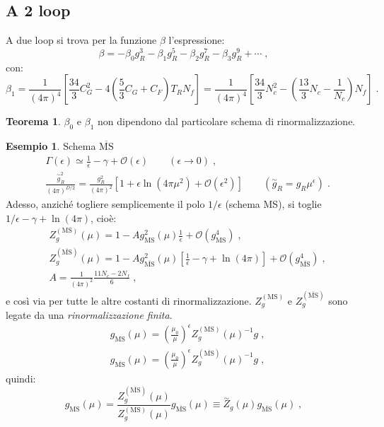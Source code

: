 \documentclass[12pt,a4paper]{article}
\theoremstyle{definition}
\newtheorem{thm}{Teorema}
\newtheorem{exm}{Esempio}
\numberwithin{equation}{section}
\begin{document}
\subsection{A 2 loop}
A due loop si trova per la funzione $\beta$ l'espressione:
$$
\beta=-\beta_0g_R^3-\beta_1g_R^5-\beta_2g_R^7-\beta_3g_R^9+\cdots\;,
$$
con:
\begin{equation}
\beta_1=\frac{1}{(4\pi)^4}\left[\frac{34}{3}C_G^2-4\left(\frac{5}{3}C_G+C_F\right)T_RN_f\right]=\frac{1}{(4\pi)^4}\left[\frac{34}{3}N_c^2-\left(\frac{13}{3}N_c-\frac{1}{N_c}\right)N_f\right]\;.
\end{equation}
\begin{thm} $\beta_0$ e $\beta_1$ non dipendono dal particolare schema di rinormalizzazione.
\end{thm}
\begin{exm} Schema $\overline{\mathrm{MS}}$
\begin{align*}
&\Gamma(\epsilon)\simeq \frac{1}{\epsilon}-\gamma+\mathcal{O}(\epsilon)\qquad (\epsilon\to 0)\;, \\
&\frac{\stackrel{\sim}{g}_R^2}{(4\pi)^{D/2}}=\frac{g_R^2}{(4\pi)^2}\left[1+\epsilon\ln(4\pi\mu^2)+\mathcal{O}(\epsilon^2)\right]\qquad (\stackrel{\sim}{g}_R=g_R\mu^{\epsilon})\;.
\end{align*}
Adesso, anziché togliere semplicemente il polo $1/\epsilon$ (schema MS), si toglie $1/\epsilon-\gamma+\ln(4\pi)$, cioè:
\begin{align*}
&Z_g^{(\mathrm{MS})}(\mu)=1-Ag_{\mathrm{MS}}^2(\mu)\frac{1}{\epsilon}+\mathcal{O}(g_{\mathrm{MS}}^4)\;, \\
&Z_g^{(\overline{\mathrm{MS}})}(\mu)=1-Ag^2_{\overline{\mathrm{MS}}}(\mu)\left[\frac{1}{\epsilon}-\gamma+\ln(4\pi)\right]+\mathcal{O}(g_{\overline{\mathrm{MS}}}^4)\;, \\
&A=\frac{1}{(4\pi)^2}\frac{11N_c-2N_f}{6}\;,
\end{align*}
e così via per tutte le altre costanti di rinormalizzazione. $Z_g^{(\mathrm{MS})}$ e $Z_g^{(\overline{\mathrm{MS}})}$ sono legate da una \emph{rinormalizzazione finita}.
\begin{align*}
&g_{\mathrm{MS}}(\mu)=\left(\frac{\mu_0}{\mu}\right)^{\epsilon}Z_g^{(\mathrm{MS})}(\mu)^{-1}g\;, \\
&g_{\overline{\mathrm{MS}}}(\mu)=\left(\frac{\mu_0}{\mu}\right)^{\epsilon}Z_g^{(\overline{\mathrm{MS}})}(\mu)^{-1}g\;,
\end{align*}
quindi:
\begin{equation}
g_{\mathrm{MS}}(\mu)=\frac{Z_g^{(\overline{\mathrm{MS}})}(\mu)}{Z_g^{(\mathrm{MS})}(\mu)}g_{\overline{\mathrm{MS}}}(\mu)\equiv \stackrel{\sim}{Z}_g(\mu)g_{\overline{\mathrm{MS}}}(\mu)\;,

\end{equation}
\end{exm}
\end{document}
